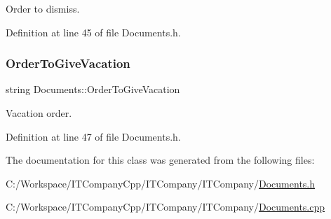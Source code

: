 Order to dismiss. 



Definition at line 45 of file Documents.\+h.

\mbox{\label{class_documents_ad55168aa0283ea51d965e732d52bee5a}} 
\subsubsection{\texorpdfstring{Order\+To\+Give\+Vacation}{OrderToGiveVacation}}
{\footnotesize\ttfamily string Documents\+::\+Order\+To\+Give\+Vacation\hspace{0.3cm}{\ttfamily [private]}}



Vacation order. 



Definition at line 47 of file Documents.\+h.



The documentation for this class was generated from the following files\+:\begin{DoxyCompactItemize}
\item 
C\+:/\+Workspace/\+I\+T\+Company\+Cpp/\+I\+T\+Company/\+I\+T\+Company/\hyperlink{_documents_8h}{Documents.\+h}\item 
C\+:/\+Workspace/\+I\+T\+Company\+Cpp/\+I\+T\+Company/\+I\+T\+Company/\hyperlink{_documents_8cpp}{Documents.\+cpp}\end{DoxyCompactItemize}
